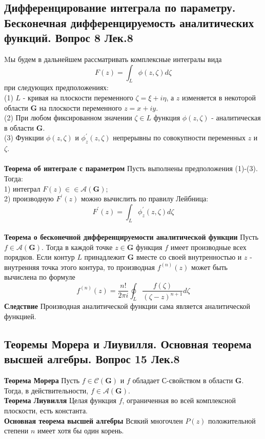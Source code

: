 \documentclass{article}
\begin{document}
\subsection{Дифференцирование интеграла по параметру. Бесконечная дифференцируемость аналитических функций. Вопрос 8 Лек.8}
	Mы будем в дальнейшем рассматривать комплексные интегралы вида
	\begin{equation}
	F(z)=\int_{L} \phi(z, \zeta) d \zeta
	\end{equation}
	при следующих предположениях:\\
	(1)  $L$ - кривая на плоскости переменного $ \zeta=\xi+i \eta$, а $z$ изменяется в некоторой области $\mathbf{G}$ на плоскости переменного $ z=x+iy$.\\
	(2) При любом фиксированном значении $ \zeta \in L $ функция $\phi(z, \zeta)$ - аналитическая в области $\mathbf{G}$.\\
	(3) Функции $ \phi(z, \zeta) $ и $ \phi_{z}^{\prime}(z, \zeta) $ непрерывны по совокупности переменных $ z $ и $ \zeta $.\\
	\\
	\textbf{Теорема об интеграле с параметром} Пусть выполнены предположения (1)-(3). Тогда: \\
	1) интеграл $ F(z) \in \in \mathcal{A}(\mathbf{G})$;\\
	2) производную $ F^{\prime}(z) $ можно вычислить по правилу Лейбница:
	\begin{equation}
	F^{\prime}(z)=\int_{L} \phi_{z}^{\prime}(z, \zeta) d \zeta
	\end{equation}
	\\
	\textbf{Теорема о бесконечной дифференцируемости аналитической функции} Пусть $ f \in \mathcal{A}(\mathbf{G}) $. Тогда в каждой точке $ z \in \mathbf{G} $ функция $ f $ имеет производные всех порядков. Если контур $L$ принадлежит $\mathbf{G}$ вместе со своей внутренностью и $ z$ - внутренняя точка этого контура, то производная $ f^{(n)}(z) $ может быть вычислена по формуле
	\begin{equation}
	f^{(n)}(z)=\frac{n !}{2 \pi i} \oint_{L} \frac{f(\zeta)}{(\zeta-z)^{n+1}} d \zeta
	\end{equation}
	\textbf{Следствие} Производная аналитической функции сама является аналитической функцией.
\subsection{Теоремы Морера и Лиувилля. Основная теорема высшей алгебры. Вопрос 15 Лек.8}
	\textbf{Теорема Морера} Пусть $f \in \mathcal{C}(\mathbf{G}) $ и $ f $ обладает $С$-свойством в области $\mathbf{G}$. Тогда, в действительности, $ f \in \mathcal{A}(\mathbf{G})$.\\ 
	\textbf{Теорема Лиувилля} Целая функция $f$, ограниченная во всей комплексной плоскости, есть константа.\\
	\textbf{Основная теорема высшей алгебры} Всякий многочлен $P(z)$ положительной степени $n$ имеет хотя бы один корень.\\
\end{document}
